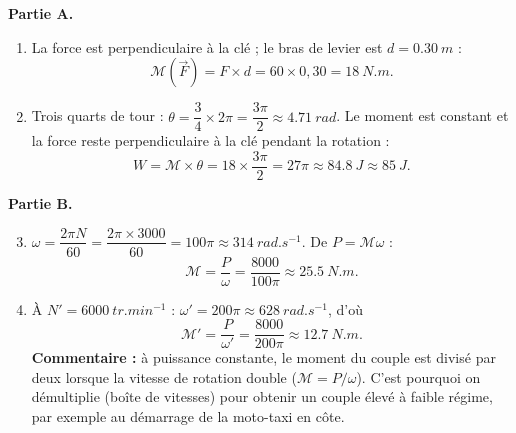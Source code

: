 \documentclass[11pt]{article}
\begin{document}
\begin{corrige}
\textbf{Partie A.}
\begin{enumerate}
\item La force est perpendiculaire à la clé ; le bras de levier est $d = \SI{0,30}{m}$ :
\[ \mathcal{M}(\vec{F}) = F\times d = 60\times 0,30 = \SI{18}{N.m}. \]
\item Trois quarts de tour : $\theta = \dfrac{3}{4}\times 2\pi = \dfrac{3\pi}{2} \approx \SI{4,71}{rad}$. Le moment est constant et la force reste perpendiculaire à la clé pendant la rotation :
\[ W = \mathcal{M}\times\theta = 18\times \dfrac{3\pi}{2} = 27\pi \approx \SI{84,8}{J} \approx \SI{85}{J}. \]
\end{enumerate}
\textbf{Partie B.}
\begin{enumerate}
\setcounter{enumi}{2}
\item $\omega = \dfrac{2\pi N}{60} = \dfrac{2\pi\times 3000}{60} = 100\pi \approx \SI{314}{rad.s^{-1}}$. De $P = \mathcal{M}\omega$ :
\[ \mathcal{M} = \dfrac{P}{\omega} = \dfrac{\num{8000}}{100\pi} \approx \SI{25,5}{N.m}. \]
\item À $N' = \SI{6000}{tr.min^{-1}}$ : $\omega' = 200\pi \approx \SI{628}{rad.s^{-1}}$, d'où
\[ \mathcal{M}' = \dfrac{P}{\omega'} = \dfrac{\num{8000}}{200\pi} \approx \SI{12,7}{N.m}. \]
\textbf{Commentaire :} à puissance constante, le moment du couple est divisé par deux lorsque la vitesse de rotation double ($\mathcal{M} = P/\omega$). C'est pourquoi on démultiplie (boîte de vitesses) pour obtenir un couple élevé à faible régime, par exemple au démarrage de la moto-taxi en côte.
\end{enumerate}
\end{corrige}
\end{document}
